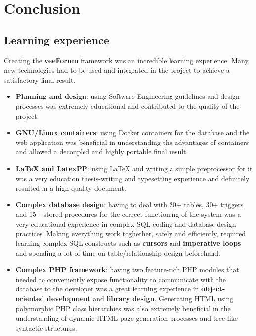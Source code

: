 \documentclass[12pt]{report}
\newcommand{\+}{\discretionary{\mbox{\scriptsize$\hookleftarrow$}}{}{}}
\renewcommand\emph{\textbf}
\begin{document}

\part{Conclusion}
    \chapter{Learning experience}

        Creating the \emph{veeForum} framework was an incredible learning experience. Many new technologies had to be used and integrated in the project to achieve a satisfactory final result.

        \begin{itemize}
            \item \emph{Planning and design}: using Software Engineering guidelines and design processes was extremely educational and contributed to the quality of the project.
            \item \emph{GNU/Linux containers}: using Docker containers for the database and the web application was beneficial in understanding the advantages of containers and allowed a decoupled and highly portable final result.
            \item \emph{\LaTeX{} and LatexPP}: using \LaTeX{} and writing a simple preprocessor for it was a very education thesis-writing and typesetting experience and definitely resulted in a high-quality document.
            \item \emph{Complex database design}: having to deal with 20+ tables, 30+ triggers and 15+ stored procedures for the correct functioning of the system was a very educational experience in complex SQL coding and database design practices. Making everything work toghether, safely and efficiently, required learning complex SQL constructs such as \emph{cursors} and \emph{imperative loops} and spending a lot of time on table/relationship design beforehand.
            \item \emph{Complex PHP framework}: having two feature-rich PHP modules that needed to conveniently expose functionality to communicate with the database to the developer was a great learning experience in \emph{object-oriented development} and \emph{library design}. Generating HTML using polymorphic PHP class hierarchies was also extremely beneficial in the understanding of dynamic HTML page generation processes and tree-like syntactic structures.
        \end{itemize}
\end{document}
